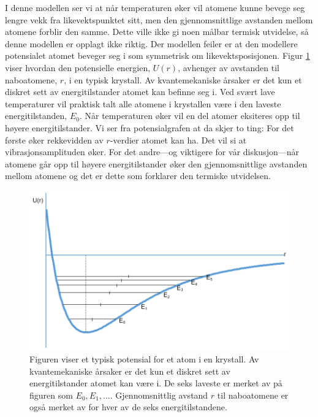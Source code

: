 I denne modellen ser vi at når temperaturen øker vil atomene kunne bevege seg lengre vekk fra likevektspunktet sitt, men den gjennomsnittlige avstanden mellom atomene forblir den samme. Dette ville ikke gi noen målbar termisk utvidelse, så denne modellen er opplagt ikke riktig. Der modellen feiler er at den modellere potensialet atomet beveger seg i som symmetrisk om likevektsposisjonen. Figur \ref{fig:fastelegemer:LennardJones} viser hvordan den potensielle energien, $U(r)$, avhenger av avstanden til naboatomene, $r$, i en typisk krystall. Av kvantemekaniske årsaker er det kun et diskret sett av energitilstander atomet kan befinne seg i. Ved svært lave temperaturer vil praktisk talt alle atomene i krystallen være i den laveste energitilstanden, $E_0$. Når temperaturen øker vil en del atomer eksiteres opp til høyere energitilstander. Vi ser fra potensialgrafen at da skjer to ting: For det første øker rekkevidden av $r$-verdier atomet kan ha. Det vil si at vibrasjonsamplituden øker. For det andre---og viktigere for vår diskusjon---når atomene går opp til høyere energitilstander øker den gjennomsnittlige avstanden mellom atomene og det er dette som forklarer den termiske utvidelsen.

\begin{figure}[tp]
	\begin{center}
	\includegraphics[width=.8\textwidth]{./LennardJones}
	\end{center}
	\caption{Figuren viser et typisk potensial for et atom i en krystall. Av kvantemekaniske årsaker er det kun et diskret sett av energitilstander atomet kan være i. De seks laveste er merket av på figuren som $E_0, E_1, \ldots$. Gjennomsnittlig avstand $r$ til naboatomene er også merket av for hver av de seks energitilstandene.}
	\label{fig:fastelegemer:LennardJones}
\end{figure}

